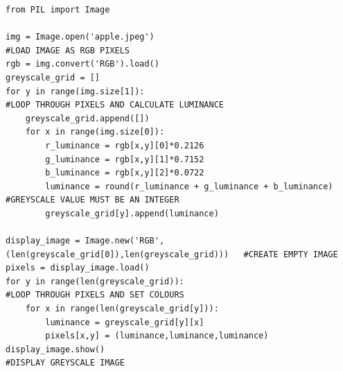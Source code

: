\documentclass[titlepage]{article}
\begin{document}
\begin{changemargin}{-1in}{-1in} 
\begin{verbatim}
from PIL import Image

img = Image.open('apple.jpeg')                                                  #LOAD IMAGE AS RGB PIXELS 
rgb = img.convert('RGB').load()
greyscale_grid = []
for y in range(img.size[1]):                                                    #LOOP THROUGH PIXELS AND CALCULATE LUMINANCE
    greyscale_grid.append([])
    for x in range(img.size[0]):
        r_luminance = rgb[x,y][0]*0.2126
        g_luminance = rgb[x,y][1]*0.7152
        b_luminance = rgb[x,y][2]*0.0722
        luminance = round(r_luminance + g_luminance + b_luminance)              #GREYSCALE VALUE MUST BE AN INTEGER
        greyscale_grid[y].append(luminance)

display_image = Image.new('RGB',(len(greyscale_grid[0]),len(greyscale_grid)))   #CREATE EMPTY IMAGE
pixels = display_image.load()
for y in range(len(greyscale_grid)):                                            #LOOP THROUGH PIXELS AND SET COLOURS
    for x in range(len(greyscale_grid[y])):
        luminance = greyscale_grid[y][x]
        pixels[x,y] = (luminance,luminance,luminance)                         
display_image.show()                                                            #DISPLAY GREYSCALE IMAGE
\end{verbatim}
\end{changemargin} 
\end{document}
